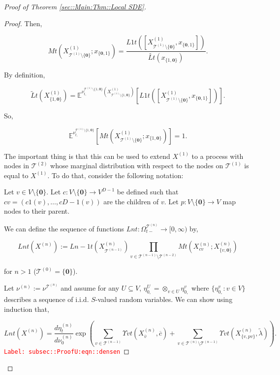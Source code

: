 \documentclass[12pt]{article}
\newcommand{\mb}{\mathbb}
\newcommand{\mc}{\mathcal}
\newcommand{\ra}{\rightarrow}
\newcommand{\ov}{\overline}
\newcommand{\tr}{\textcolor{red}}
\newcommand{\labe}[1]{\tr{\texttt{Label: #1}}}
\newcommand{\ind}{\hspace{24pt}}
\newcommand{\exmu}[2]{\mb{E}^{#1}\left[#2\right]}	%
\newcommand{\defeq}{:=}								%
\renewcommand{\root}{\mathbf{0}}				%
\renewcommand{\v}{v}							%
\renewcommand{\U}{U}							%
\renewcommand{\S}{S}							%
\newcommand{\x}{x}								%
\renewcommand{\t}{t}							%
\newcommand{\sset}{\Omega}						%
\newcommand{\X}{X}								%
\newcommand{\vind}[1]{^{#1}}					%
\newcommand{\vsi}[1]{^{#1}}						%
\newcommand{\cind}[1]{_{#1}}					%
\newcommand{\cl}{\ov}							%
\newcommand{\tip}[1]{#1}						%
\newcommand{\ts}[1]{_{#1}}						%
\newcommand{\degr}{D}							%
\newcommand{\IGrg}{\ov{c}}						%
\newcommand{\tree}{\mc{T}}						%
\newcommand{\sln}[1]{^{(#1)}}						%
\newcommand{\alt}[1]{\widetilde{#1}}			%
\newcommand{\mm}{\nu}							%
\newcommand{\mmm}{\eta}							%
\newcommand{\crate}{\alt{\lambda}}				%
\newcommand{\dense}{L}							%
\newcommand{\cdense}{M}							%
\newcommand{\ds}{\Upsilon}						%
\renewcommand{\c}{c}							%
\newcommand{\p}{p}								%
\begin{document}
\begin{proof}[Proof of Theorem \ref{sec::Main:Thm::Local SDE}]
\begin{proof}
Then,

\[\cdense{}{\t}(\X\sln{1}\cind{\tree\sln{1}\setminus\{\root\}}\tip{};\x\cind{\{\root,1\}}\tip{}) = \frac{\dense{1}{\t}([\X\sln{1}\cind{\tree\sln{1}\setminus\{\root\}}\tip{},\x\cind{\{\root,1\}}\tip{}])}{\alt{\dense{}{\t}}(\x\cind{\{1,\root\}}\tip{})}.\]

By definition,

\[\alt{\dense}{}{\t}(\X\sln{1}\cind{\{1,\root\}}\tip{}) = \exmu{\mm\vind{\tree\sln{1}\setminus\{1,\root\}}\ts{\t,}(\X\sln{1}\cind{\tree\sln{1}\setminus\{1,\root\}}\tip{})}{\dense{1}{\t}([\X\sln{1}\cind{\tree\sln{1}\setminus\{\root\}}\tip{},\x\cind{\{\root,1\}}\tip{}])}.\]

So,

\[\exmu{\mm\vind{\tree\sln{1}\setminus\{1,\root\}}\ts{\t,}}{\cdense{}{\t}(\X\sln{1}\cind{\tree\sln{1}\setminus\{\root\}}\tip{};\x\cind{\{1,\root\}}\tip{})} = 1.\]

The important thing is that this can be used to extend \(\X\sln{1}\cind{}\tip{}\) to a process with nodes in \(\tree\sln{2}\) whose marginal distribution with respect to the nodes on \(\tree\sln{1}\) is equal to \(\X\sln{1}\cind{}\tip{}\). To do that, consider the following notation:

\ind Let \(\v \in V\setminus\{\root\}\). Let \(\c{}:V\setminus\{\root\} \ra V^{\degr-1}\) be defined such that \(\c{\v} = (\c{1}(\v),\dots,\c{\degr-1}(\v))\) are the children of \(\v\). Let \(\p{}:V\setminus\{\root\}\ra V\) map nodes to their parent.

\ind We can define the sequence of functions \(\dense{n}{\t}: \sset\vsi{\tree\sln{n}}\ts{\t-} \ra [0,\infty)\) by,

\[\dense{n}{\t}(\X\sln{n}\cind{}\tip{}) := \dense{n-1}{\t}(\X\sln{n}\cind{\tree\sln{n-1}}\tip{})\prod_{\v\in \tree\sln{n-1}\setminus\tree\sln{n-2}} \cdense{}{\t}(\X\sln{n}\cind{\c{\v}}\tip{};\X\sln{n}\cind{\{\v,\root\}}\tip{})\]

for \(n > 1\) (\(\tree\sln{0} = \{\root\}\)). 

\ind Let \(\mm\sln{n}\ts{}\defeq \mm\vind{\tree\sln{n}}\ts{}\) and assume for any \(\U \subseteq V\), \(\mmm\vind{\U}\ts{0,} = \otimes_{\v\in\U}\mmm\vind{\v}\ts{0,}\) where \(\{\mmm\vind{\v}\ts{0,}:\v\in V\}\) describes a sequence of i.i.d. \(\S\)-valued random variables. We can show using induction that,

\begin{equation}
\dense{n}{\t}(\X\sln{n}\cind{}\tip{}) = \frac{d\mmm\sln{n}\ts{\t}}{d\mm\sln{n}\ts{0}}\exp\left(\sum_{\v\in\tree\sln{n-1}}\ds{\v}{\t}(\X\sln{n}\cind{\cl{\v}}\tip{},\IGrg{}) + \sum_{\v\in\tree\sln{n}\setminus\tree\sln{n-1}} \ds{\v}{\t}(\X\sln{n}\cind{\{v,\p{\v}\}}\tip{},\crate{}{})\right).
\label{subsec::ProofU:eqn::densen}
\end{equation}
\labe{subsec::ProofU:eqn::densen}


\end{proof}
\end{proof}
\end{document}
